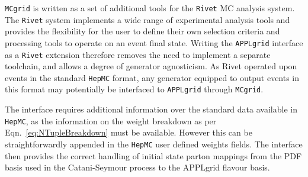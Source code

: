 {\tt MCgrid} is written as a set of additional tools for the {\tt Rivet} MC analysis system. The {\tt Rivet} system implements a wide range of experimental analysis tools and provides the flexibility for the user to define their own selection criteria and processing tools to operate on an event final state. Writing the {\tt APPLgrid} interface as a {\tt Rivet} extension therefore removes the need to implement a separate toolchain, and allows a degree of generator agnosticism. As {\tt} Rivet operated upon events in the standard {\tt HepMC} format, any generator equipped to output events in this format may potentially be interfaced to {\tt APPLgrid} through {\tt MCgrid}.

The interface requires additional information over the standard data available in {\tt HepMC}, as the information on the weight breakdown as per Eqn.~\ref{eq:NTupleBreakdown} must be available. However this can be straightforwardly appended in the {\tt HepMC} user defined weights fields. The interface then provides the correct handling of initial state parton mappings from the PDF basis used in the Catani-Seymour process to the APPLgrid flavour basis.

